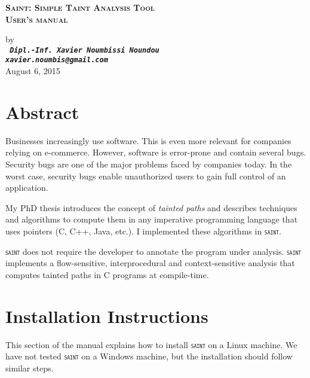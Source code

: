 \documentclass[12pt,onecolumn,a4paper]{article}
\newcommand{\saint}{\texttt{\textsc{saint}}\xspace}
\begin{document}
\pagestyle{empty}

\author{Xavier NOUMBISSI NOUNDOU}

\begin{center}
\begin{LARGE}
\textbf{ \textsc{Saint: Simple Taint Analysis Tool\\
				User's manual}}\\
\end{LARGE}
\begin{large}
\vspace{0.3cm}
by\\
\vspace{0.3cm}
\texttt{ \bf \textit{Dipl.-Inf. Xavier Noumbissi Noundou\\
xavier.noumbis@gmail.com}}\\
\vspace{0.3cm}
August 6, 2015\\
\vspace{1.3cm}
\end{large}
\end{center}

\tableofcontents

\section{Abstract}
Businesses increasingly use software. This is even more
relevant for companies relying on e-commerce. However,
software is error-prone and contain several bugs. Security
bugs are one of the major problems faced by companies today.
In the worst case, security bugs enable unauthorized users
to gain full control of an application.

My PhD thesis introduces the concept of 
\textcolor{firebrickred}{\textit{tainted paths}} and
describes techniques and algorithms to compute them in
any imperative programming language that uses
pointers (C, C++, Java, etc.). I implemented these
algorithms in \saint.

\saint does not require the developer to annotate
the program under analysis. \saint implements a
flow-sensitive, interprocedural and context-sensitive
analysis that computes tainted paths in C programs
at compile-time.

\section{Installation Instructions}
This section of the manual explains how to install \saint
on a Linux machine. We have not tested \saint on a Windows
machine, but the installation should follow similar steps. 
\end{document}

